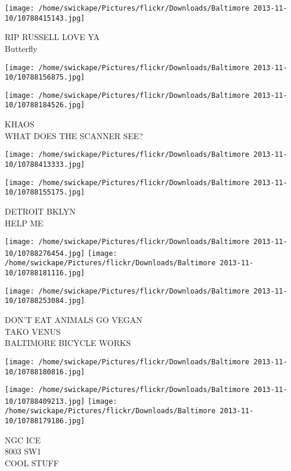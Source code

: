 \documentclass[10pt,letterpaper]{article}
\begin{document}
\vspace{0.25in}
\texttt{[image: /home/swickape/Pictures/flickr/Downloads/Baltimore 2013-11-10/10788415143.jpg]}

RIP RUSSELL LOVE YA\\
Butterfly\\
\pagebreak

\texttt{[image: /home/swickape/Pictures/flickr/Downloads/Baltimore 2013-11-10/10788156875.jpg]}

\vspace{0.25in}
\texttt{[image: /home/swickape/Pictures/flickr/Downloads/Baltimore 2013-11-10/10788184526.jpg]}

KHAOS\\
WHAT DOES THE SCANNER SEE?\\
\pagebreak

\texttt{[image: /home/swickape/Pictures/flickr/Downloads/Baltimore 2013-11-10/10788413333.jpg]}

\vspace{0.25in}
\texttt{[image: /home/swickape/Pictures/flickr/Downloads/Baltimore 2013-11-10/10788155175.jpg]}

DETROIT BKLYN\\
HELP ME\\
\pagebreak

\texttt{[image: /home/swickape/Pictures/flickr/Downloads/Baltimore 2013-11-10/10788276454.jpg]}
\texttt{[image: /home/swickape/Pictures/flickr/Downloads/Baltimore 2013-11-10/10788181116.jpg]}

\texttt{[image: /home/swickape/Pictures/flickr/Downloads/Baltimore 2013-11-10/10788253084.jpg]}

DON'T EAT ANIMALS GO VEGAN\\
TAKO VENUS\\
BALTIMORE BICYCLE WORKS\\
\pagebreak

\texttt{[image: /home/swickape/Pictures/flickr/Downloads/Baltimore 2013-11-10/10788180816.jpg]}

\vspace{0.25in}
\texttt{[image: /home/swickape/Pictures/flickr/Downloads/Baltimore 2013-11-10/10788409213.jpg]}
\texttt{[image: /home/swickape/Pictures/flickr/Downloads/Baltimore 2013-11-10/10788179186.jpg]}

NGC ICE\\
8003 SW1\\
COOL STUFF\\
\pagebreak
\end{document}
